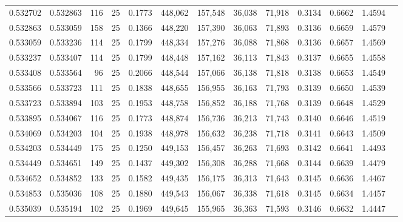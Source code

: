 \begin{tabular}{rrrrrrrrrrrrr}
0.532702 & 0.532863 &   116 &  25 &                                     0.1773 & 448,062 & 157,548 &  36,038 &  71,918 & 0.3134 & 0.6662 & 1.4594 \\
0.532863 & 0.533059 &   158 &  25 &                                     0.1366 & 448,220 & 157,390 &  36,063 &  71,893 & 0.3136 & 0.6659 & 1.4579 \\
0.533059 & 0.533236 &   114 &  25 &                                     0.1799 & 448,334 & 157,276 &  36,088 &  71,868 & 0.3136 & 0.6657 & 1.4569 \\
0.533237 & 0.533407 &   114 &  25 &                                     0.1799 & 448,448 & 157,162 &  36,113 &  71,843 & 0.3137 & 0.6655 & 1.4558 \\
0.533408 & 0.533564 &    96 &  25 &                                     0.2066 & 448,544 & 157,066 &  36,138 &  71,818 & 0.3138 & 0.6653 & 1.4549 \\
0.533566 & 0.533723 &   111 &  25 &                                     0.1838 & 448,655 & 156,955 &  36,163 &  71,793 & 0.3139 & 0.6650 & 1.4539 \\
0.533723 & 0.533894 &   103 &  25 &                                     0.1953 & 448,758 & 156,852 &  36,188 &  71,768 & 0.3139 & 0.6648 & 1.4529 \\
0.533895 & 0.534067 &   116 &  25 &                                     0.1773 & 448,874 & 156,736 &  36,213 &  71,743 & 0.3140 & 0.6646 & 1.4519 \\
0.534069 & 0.534203 &   104 &  25 &                                     0.1938 & 448,978 & 156,632 &  36,238 &  71,718 & 0.3141 & 0.6643 & 1.4509 \\
0.534203 & 0.534449 &   175 &  25 &                                     0.1250 & 449,153 & 156,457 &  36,263 &  71,693 & 0.3142 & 0.6641 & 1.4493 \\
0.534449 & 0.534651 &   149 &  25 &                                     0.1437 & 449,302 & 156,308 &  36,288 &  71,668 & 0.3144 & 0.6639 & 1.4479 \\
0.534652 & 0.534852 &   133 &  25 &                                     0.1582 & 449,435 & 156,175 &  36,313 &  71,643 & 0.3145 & 0.6636 & 1.4467 \\
0.534853 & 0.535036 &   108 &  25 &                                     0.1880 & 449,543 & 156,067 &  36,338 &  71,618 & 0.3145 & 0.6634 & 1.4457 \\
0.535039 & 0.535194 &   102 &  25 &                                     0.1969 & 449,645 & 155,965 &  36,363 &  71,593 & 0.3146 & 0.6632 & 1.4447 \\

\end{tabular}
